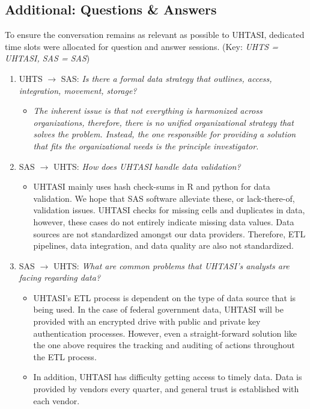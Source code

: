 \subsection{Additional: Questions \& Answers}

To ensure the conversation remains as relevant as possible to UHTASI, dedicated time slots were allocated for question and answer sessions. (Key: \textit{UHTS = UHTASI, SAS = SAS})

\begin{enumerate}
    \item UHTS $\rightarrow$ SAS: \textit{Is there a formal data strategy that outlines, access, integration, movement, storage?}
    \begin{itemize}
        \item \textit{The inherent issue is that not everything is harmonized across organizations, therefore, there is no unified organizational strategy that solves the problem. Instead, the one responsible for providing a solution that fits the organizational needs is the principle investigator.}
    \end{itemize}
    \item SAS $\rightarrow$ UHTS: \textit{How does UHTASI handle data validation?}
    \begin{itemize}
        \item UHTASI mainly uses hash check-sums in R and python for data validation. We hope that SAS software alleviate these, or lack-there-of, validation issues. UHTASI checks for missing cells and duplicates in data, however, these cases do not entirely indicate missing data values. Data sources are not standardized amongst our data providers. Therefore, ETL pipelines, data integration, and data quality are also not standardized.
    \end{itemize}
    \item SAS $\rightarrow$ UHTS: \textit{What are common problems that UHTASI's analysts are facing regarding data?}
    \begin{itemize}
        \item UHTASI's ETL process is dependent on the type of data source that is being used. In the case of federal government data, UHTASI will be provided with an encrypted drive with public and private key authentication processes. However, even a straight-forward solution like the one above requires the tracking and auditing of actions throughout the ETL process. 
        \item In addition, UHTASI has difficulty getting access to timely data. Data is provided by vendors every quarter, and general trust is established with each vendor.
    \end{itemize}
\end{enumerate}